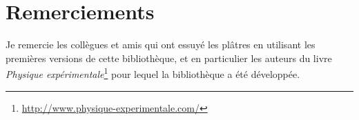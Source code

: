 \documentclass[a4paper]{ltxdoc}
\begin{document}
\section{Remerciements}

Je remercie les collègues et amis qui ont essuyé les plâtres en utilisant les premières versions de cette bibliothèque, et en particulier les auteurs du livre \emph{Physique expérimentale}\footnote{\url{http://www.physique-experimentale.com/}} pour lequel la bibliothèque a été développée.
\end{document}
